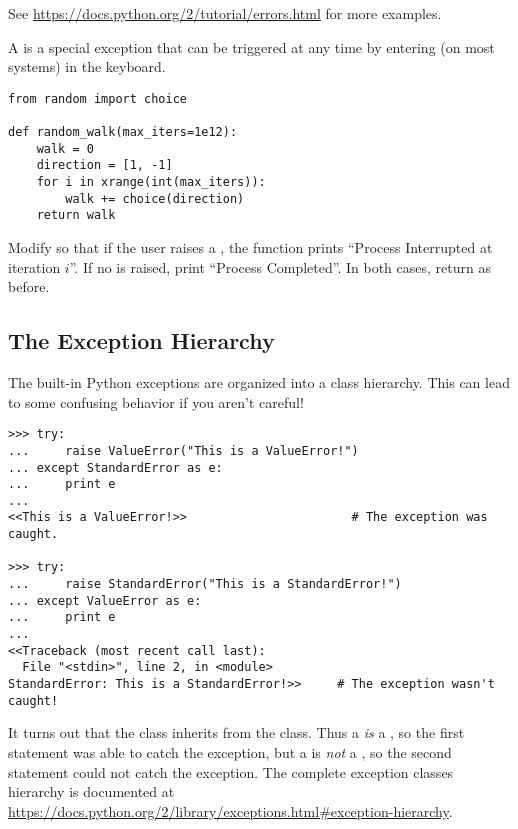 See \url{https://docs.python.org/2/tutorial/errors.html} for more examples.

\begin{problem} %
A  is a special exception that can be triggered at any time by entering  (on most systems) in the keyboard.

\begin{lstlisting}
from random import choice

def random_walk(max_iters=1e12):
    walk = 0
    direction = [1, -1]
    for i in xrange(int(max_iters)):
        walk += choice(direction)
    return walk
\end{lstlisting}
Modify  so that if the user raises a , the function prints ``Process Interrupted at iteration $i$''.
If no  is raised, print ``Process Completed''.
In both cases, return  as before.
\end{problem}

\subsection*{The Exception Hierarchy} %

The built-in Python exceptions are organized into a class hierarchy.
This can lead to some confusing behavior if you aren't careful!

\begin{lstlisting}
>>> try:
...     raise ValueError("This is a ValueError!")
... except StandardError as e:
...     print e
...
<<This is a ValueError!>>                       # The exception was caught.

>>> try:
...     raise StandardError("This is a StandardError!")
... except ValueError as e:
...     print e
...
<<Traceback (most recent call last):
  File "<stdin>", line 2, in <module>
StandardError: This is a StandardError!>>     # The exception wasn't caught!
\end{lstlisting}

It turns out that the  class inherits from the  class.
Thus a  \emph{is} a , so the first  statement was able to catch the exception, but a  is \emph{not} a , so the second  statement could not catch the exception.
The complete exception classes hierarchy is documented at \url{https://docs.python.org/2/library/exceptions.html#exception-hierarchy}.

